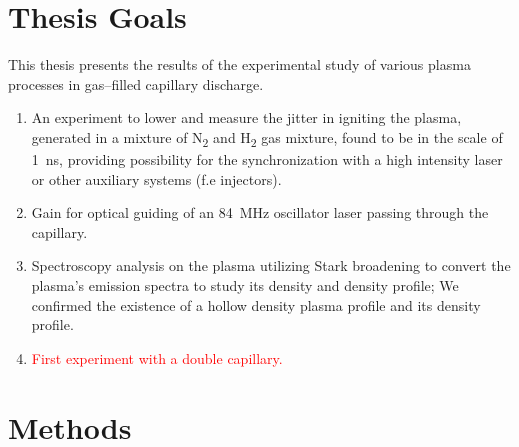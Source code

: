 \documentclass[justified,nofonts,nobib,openany]{tufte-book}
\begin{document}


\chapter{Thesis Goals}\label{chap:goals}
This thesis presents the results of the experimental study of various plasma processes in gas--filled capillary discharge.
\begin{enumerate}
  \item An experiment to lower and measure the jitter in igniting the plasma, generated in a mixture of N\textsubscript{2} and H\textsubscript{2} gas mixture, found to be in the scale of \SI{1}{\ns}, providing possibility for the synchronization with a high intensity laser or other auxiliary systems (f.e injectors).
  \item Gain for optical guiding of an \SI{84}{\MHz} oscillator laser passing through the capillary.
  \item Spectroscopy analysis on the plasma utilizing Stark broadening to convert the plasma's emission spectra to study its density and density profile; We confirmed the existence of a hollow density plasma profile and its density profile.
  \item \textcolor{red}{First experiment with a double capillary.}
\end{enumerate}
	\chapter{Methods}\label{chap:methods}
\end{document}

